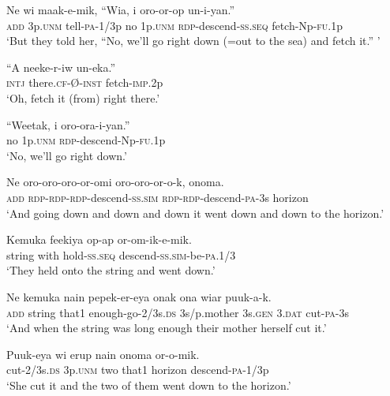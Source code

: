 {\ea\label{ex:a:x20}
\gll  Ne  wi  maak-e-mik,  “Wia,  i  oro-or-op            un-i-yan.” \\
\textsc{add}  3p.\textsc{unm}  tell-\textsc{pa}-1/3p  no  1p.\textsc{unm}  \textsc{rdp}-descend-\textsc{ss.seq} fetch-Np-\textsc{fu}.1p \\


\glt ‘But they told her, “No, we’ll go right down (=out to the sea) and fetch it.” ’ \\
\z


\ea\label{ex:a:x21}
\gll  “A  neeke-r-iw  un-eka.” \\
\textsc{intj}  there.\textsc{cf}-Ø-\textsc{inst}  fetch-\textsc{imp}.2p \\
\glt ‘Oh, fetch it (from) right there.’ \\
\z


\ea\label{ex:a:x22}
\gll  “Weetak,  i  oro-ora-i-yan.” \\
no  1p.\textsc{unm}  \textsc{rdp}-descend-Np-\textsc{fu}.1p \\
\glt ‘No, we’ll go right down.’ \\
\z


\ea\label{ex:a:x23}
\gll  Ne  oro-oro-oro-or-omi  oro-oro-or-o-k,  onoma. \\
\textsc{add}  \textsc{rdp}-\textsc{rdp}-\textsc{rdp}-descend-\textsc{ss}.\textsc{sim}  \textsc{rdp}-\textsc{rdp}-descend-\textsc{pa}-3s  horizon \\
\glt ‘And going down and down and down it went down and down to the horizon.’ \\
\z


\ea\label{ex:a:x24}
\gll  Kemuka  feekiya  op-ap  or-om-ik-e-mik. \\
string  with  hold-\textsc{ss.seq}  descend-\textsc{ss}.\textsc{sim}-be-\textsc{pa}.1/3 \\
\glt ‘They held onto the string and went down.’ \\
\z


\ea\label{ex:a:x25}
\gll  Ne  kemuka  nain  pepek-er-eya  onak  ona  wiar  puuk-a-k. \\
\textsc{add}  string  that1  enough-go-2/3s.\textsc{ds}  3s/p.mother  3s.\textsc{gen}  3.\textsc{dat}  cut-\textsc{pa}-3s \\
\glt ‘And when the string was long enough their mother herself cut it.’ \\
\z


\ea\label{ex:a:x26}
\gll  Puuk-eya  wi  erup  nain  onoma  or-o-mik. \\
cut-2/3s.\textsc{ds}  3p.\textsc{unm}  two  that1  horizon  descend-\textsc{pa}-1/3p \\
\glt ‘She cut it and the two of them went down to the horizon.’ \\
\z


}
